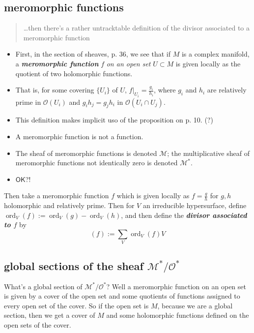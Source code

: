 \subsection{meromorphic functions}

\begin{quotation}
…then there's a rather untracktable definition of the divisor associated to a meromorphic function
\end{quotation}

\begin{itemize}
\item First, in the section of sheaves, \cite{gri} p. 36, we see that if \(M\) is a complex manifold, a \textit{\textbf{meromorphic function}} \(f\) \textit{on an open set} \(U \subset M\) is given locally as the quotient of two holomorphic functions.

\item That is, for some covering \(\{U_i\}\) of \(U\), \(f|_{U_i}=\frac{g_i}{h_i}\), where \(g_i\) and \(h_i\) are relatively prime in \(\mathcal{O}(U_i)\) and \(g_ih_j=g_jh_i\) in \(\mathcal{O}(U_i \cap U_j)\).

\item This definition makes implicit uso of the proposition on p. 10. (?)

\item  A meromorphic function is not a function.

\item  The sheaf of meromorphic functions is denoted \(\mathcal{M}\); the multiplicative sheaf of meromorphic functions not identically zero is denoted \(\mathcal{M}^*\).

\item \(\mathsf{OK}\)?!
\end{itemize}
Then take a meromorphic function \(f\) which is given locally as \(f=\frac{g}{h}\) for \(g,h\) holomorphic and relatively prime. Then for \(V\) an irreducible hypersurface, define \(\operatorname{ord}_V(f):=\operatorname{ord}_V(g)-\operatorname{ord}_V(h)\), and then define the \textit{\textbf{divisor associated to \(f\)}} by
\[(f):=\sum_V \operatorname{ord}_V(f)V\]

\subsection{global sections of the sheaf \(\mathcal{M}^*/\mathcal{O}^*\)}

What's a global section of \(\mathcal{M}^*/\mathcal{O}^*\)? Well a meromorphic function on an open set is given by a cover of the open set and some quotients of functions assigned to every open set of the cover. So if the open set is \(M\), because we are a global section, then we get a cover of \(M\) and some holomorphic functions defined on the open sets of the cover.

